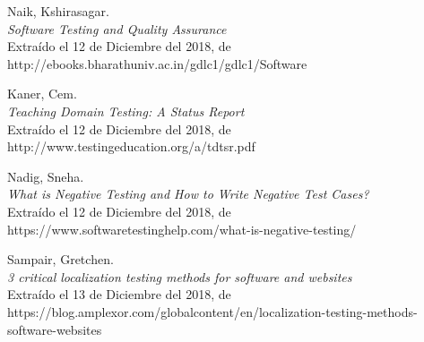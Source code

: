 \begin{thebibliography}{99}
 Naik, Kshirasagar.\\
\emph{Software Testing and Quality Assurance}\\
Extraído el 12 de Diciembre del 2018, de\\
http://ebooks.bharathuniv.ac.in/gdlc1/gdlc1/Software%

 Kaner, Cem.\\
\emph{Teaching Domain Testing: A Status Report}\\
Extraído el 12 de Diciembre del 2018, de\\
http://www.testingeducation.org/a/tdtsr.pdf

 Nadig, Sneha.\\
\emph{What is Negative Testing and How to Write Negative Test Cases?}\\
Extraído el 12 de Diciembre del 2018, de\\
https://www.softwaretestinghelp.com/what-is-negative-testing/

 Sampair, Gretchen.\\
\emph{3 critical localization testing methods for software and websites}\\
Extraído el 13 de Diciembre del 2018, de\\
https://blog.amplexor.com/globalcontent/en/localization-testing-methods-software-websites

\end{thebibliography}

